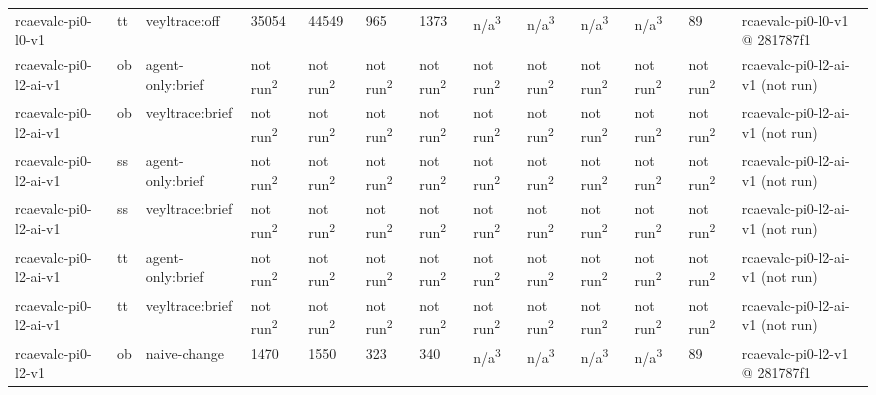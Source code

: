\begin{table}[t]
\begin{tabular}{lllllllllllll}
rcaevalc-pi0-l0-v1 & tt & veyltrace:off & 35054 & 44549 & 965 & 1373 & n/a\textsuperscript{3} & n/a\textsuperscript{3} & n/a\textsuperscript{3} & n/a\textsuperscript{3} & 89 & rcaevalc-pi0-l0-v1 @ 281787f1 \\
rcaevalc-pi0-l2-ai-v1 & ob & agent-only:brief & not run\textsuperscript{2} & not run\textsuperscript{2} & not run\textsuperscript{2} & not run\textsuperscript{2} & not run\textsuperscript{2} & not run\textsuperscript{2} & not run\textsuperscript{2} & not run\textsuperscript{2} & not run\textsuperscript{2} & rcaevalc-pi0-l2-ai-v1 (not run) \\
rcaevalc-pi0-l2-ai-v1 & ob & veyltrace:brief & not run\textsuperscript{2} & not run\textsuperscript{2} & not run\textsuperscript{2} & not run\textsuperscript{2} & not run\textsuperscript{2} & not run\textsuperscript{2} & not run\textsuperscript{2} & not run\textsuperscript{2} & not run\textsuperscript{2} & rcaevalc-pi0-l2-ai-v1 (not run) \\
rcaevalc-pi0-l2-ai-v1 & ss & agent-only:brief & not run\textsuperscript{2} & not run\textsuperscript{2} & not run\textsuperscript{2} & not run\textsuperscript{2} & not run\textsuperscript{2} & not run\textsuperscript{2} & not run\textsuperscript{2} & not run\textsuperscript{2} & not run\textsuperscript{2} & rcaevalc-pi0-l2-ai-v1 (not run) \\
rcaevalc-pi0-l2-ai-v1 & ss & veyltrace:brief & not run\textsuperscript{2} & not run\textsuperscript{2} & not run\textsuperscript{2} & not run\textsuperscript{2} & not run\textsuperscript{2} & not run\textsuperscript{2} & not run\textsuperscript{2} & not run\textsuperscript{2} & not run\textsuperscript{2} & rcaevalc-pi0-l2-ai-v1 (not run) \\
rcaevalc-pi0-l2-ai-v1 & tt & agent-only:brief & not run\textsuperscript{2} & not run\textsuperscript{2} & not run\textsuperscript{2} & not run\textsuperscript{2} & not run\textsuperscript{2} & not run\textsuperscript{2} & not run\textsuperscript{2} & not run\textsuperscript{2} & not run\textsuperscript{2} & rcaevalc-pi0-l2-ai-v1 (not run) \\
rcaevalc-pi0-l2-ai-v1 & tt & veyltrace:brief & not run\textsuperscript{2} & not run\textsuperscript{2} & not run\textsuperscript{2} & not run\textsuperscript{2} & not run\textsuperscript{2} & not run\textsuperscript{2} & not run\textsuperscript{2} & not run\textsuperscript{2} & not run\textsuperscript{2} & rcaevalc-pi0-l2-ai-v1 (not run) \\
rcaevalc-pi0-l2-v1 & ob & naive-change & 1470 & 1550 & 323 & 340 & n/a\textsuperscript{3} & n/a\textsuperscript{3} & n/a\textsuperscript{3} & n/a\textsuperscript{3} & 89 & rcaevalc-pi0-l2-v1 @ 281787f1 \\

\end{tabular}
\end{table}
